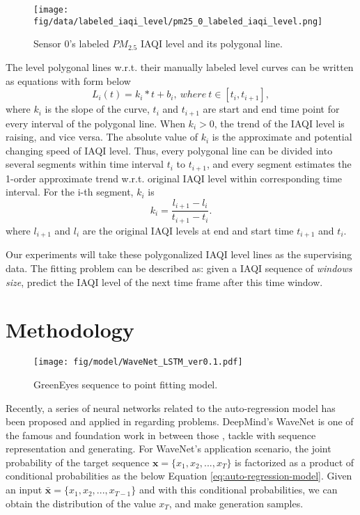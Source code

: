 \documentclass[
twocolumn,
]{ceurart}
\begin{document}
\begin{figure*}[!htbp]
    \centering
    \texttt{[image: fig/data/labeled\_iaqi\_level/pm25\_0\_labeled\_iaqi\_level.png]}
    \caption{Sensor 0's labeled $PM_{2.5}$ IAQI level and its polygonal line.}
    \label{fig:pm25_0_labeled_level}
\end{figure*}

The level polygonal lines w.r.t. their manually labeled level curves can be written as equations with form below
\begin{equation}
    \label{formula:polygonal}
    L_i(t)=k_i*t+b_i,\ where\ t\in[t_i,t_{i+1}],
\end{equation}
where $k_i$ is the slope of the curve, $t_i$ and $t_{i+1}$ are start and end time point for every interval of the polygonal line. When $k_i>0$, the trend of the IAQI level is raising, and vice versa. The absolute value of $k_i$ is the approximate and potential changing speed of IAQI level. Thus, every polygonal line can be divided into several segments within time interval $t_i$ to $t_{i+1}$, and every segment estimates the 1-order approximate trend w.r.t. original IAQI level within corresponding time interval. For the i-th segment, $k_i$ is
\begin{equation}
    k_i = \frac{l_{i+1}-l_i}{t_{i+1}-t_i}.
\end{equation}
where $l_{i+1}$ and $l_i$ are the original IAQI levels at end and start time $t_{i+1}$ and $t_i$.

Our experiments will take these polygonalized IAQI level lines as the supervising data. The fitting problem can be described as: given a IAQI sequence of \textit{windows size}, predict the IAQI level of the next time frame after this time window.


\section{Methodology}\label{sec:model_design}

\begin{figure*}[!htbp]
  \centering
  \texttt{[image: fig/model/WaveNet\_LSTM\_ver0.1.pdf]}
  \caption{GreenEyes sequence to point fitting model.}
  \label{fig:greeneyes_model}
\end{figure*}

Recently, a series of neural networks related to the auto-regression model has been proposed and applied in regarding problems. DeepMind's WaveNet \cite{oord2016wavenet} is one of the famous and foundation work in between those \cite{shen2018natural}, \cite{wang2017tacotron} tackle with sequence representation and generating. For WaveNet's application scenario, the joint probability of the target sequence $\textbf{x}=\{x_1,x_2,...,x_T\}$ is factorized as a product of conditional probabilities as the below Equation \ref{eq:auto-regression-model}. Given an input $\bar{\textbf{x}}=\{x_1,x_2,...,x_{T-1}\}$ and with this conditional probabilities, we can obtain the distribution of the value $x_T$, and make generation samples.
\end{document}
